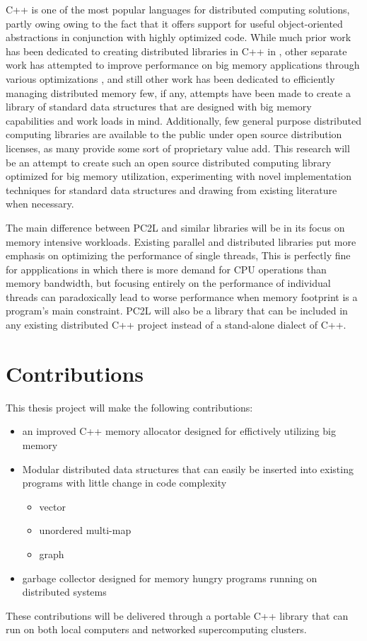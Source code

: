 C++ is one of the most popular languages for distributed computing solutions, partly owing owing to the fact that it offers support for useful object-oriented abstractions in conjunction with highly optimized code. \cite{towards_dist_cpp} While much prior work has been dedicated to creating distributed libraries in C++ in \cite{STAPL}  \cite{practical_dist_c}
\cite{taskflow} \cite{intel_tbb} \cite{parallel_programming_w_charm} \cite{chapel} \cite{X10}, other separate work has attempted to improve performance on big memory applications through various optimizations \cite{virtual_memory_tlb}, and still other work has been dedicated to efficiently managing distributed memory \cite{spark} \cite{zookeeper} \cite{memcached} \cite{GAM}  few, if any, attempts have been made to create a library of standard data structures that are designed with big memory capabilities and work loads in mind. Additionally, few general purpose distributed computing libraries are available to the public under open source distribution licenses, as many provide some sort of proprietary value add. This research will be an attempt to create such an open source distributed computing library optimized for big memory utilization, experimenting with novel implementation techniques for standard data structures and drawing from existing literature when necessary. 

The main difference between PC2L and similar libraries will be in its focus on memory intensive workloads. Existing parallel and distributed libraries put more emphasis on optimizing the performance of single threads, This is perfectly fine for appplications in which there is more demand for CPU operations than memory bandwidth, but focusing entirely on the performance of individual threads can paradoxically lead to worse performance when memory footprint is a program's main constraint. PC2L will also be a library that can be included in any existing distributed C++ project instead of a stand-alone dialect of C++.    
\section{Contributions}
This thesis project will make the following contributions:
    \begin{itemize}
        \item an improved C++ memory allocator designed for effictively utilizing big memory
        \item Modular distributed data structures that can easily be inserted into existing programs with little change in code complexity 
            \begin{itemize}
                \item vector
                \item unordered multi-map
                \item graph
            \end{itemize}
        \item garbage collector designed for memory hungry programs running on distributed systems
    \end{itemize}
These contributions will be delivered through a portable C++ library that can run on both local computers and networked supercomputing clusters. 
